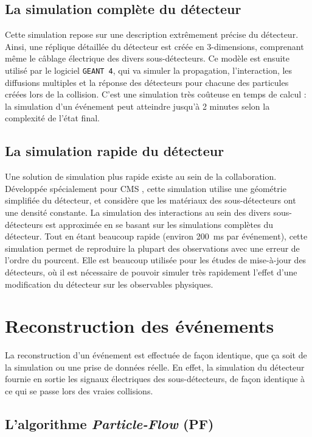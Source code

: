 \subsection{La simulation complète du détecteur}

Cette simulation repose sur une description extrêmement précise du détecteur. Ainsi, une réplique détaillée du détecteur est créée en 3-dimensions, comprenant même le câblage électrique des divers sous-détecteurs. Ce modèle est ensuite utilisé par le logiciel \texttt{GEANT 4}, qui va simuler la propagation, l'interaction, les diffusions multiples et la réponse des détecteurs pour chacune des particules créées lors de la collision. C'est une simulation très coûteuse en temps de calcul : la simulation d'un événement peut atteindre jusqu'à 2 minutes selon la complexité de l'état final.

\subsection{La simulation rapide du détecteur}

Une solution de simulation plus rapide existe au sein de la collaboration. Développée spécialement pour CMS \citep{1742-6596-219-3-032053}, cette simulation utilise une géométrie simplifiée du détecteur, et considère que les matériaux des sous-détecteurs ont une densité constante. La simulation des interactions au sein des divers sous-détecteurs est approximée en se basant sur les simulations complètes du détecteur. Tout en étant beaucoup rapide (environ \SI{200}{\ms} par événement), cette simulation permet de reproduire la plupart des observations avec une erreur de l'ordre du pourcent.  Elle est beaucoup utilisée pour les études de mise-à-jour des détecteurs, où il est nécessaire de pouvoir simuler très rapidement l'effet d'une modification du détecteur sur les observables physiques.

\section{Reconstruction des événements}

La reconstruction d'un événement est effectuée de façon identique, que ça soit de la simulation ou une prise de données réelle. En effet, la simulation du détecteur fournie en sortie les signaux électriques des sous-détecteurs, de façon identique à ce qui se passe lors des vraies collisions.

\subsection{L'algorithme \emph{Particle-Flow} (PF)}

